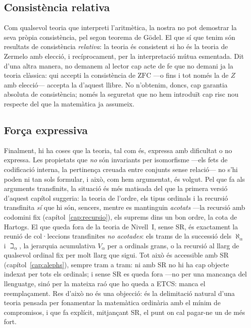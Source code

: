 \subsection{Consistència relativa}\label{subsec:consistencia}

Com qualsevol teoria que interpreti l'aritmètica, la nostra no pot
demostrar la seva pròpia consistència, pel segon teorema de Gödel. El que
sí que tenim són resultats de consistència \emph{relativa}: la teoria és
consistent si ho és la teoria de Zermelo amb elecció, i recíprocament, per
la interpretació mútua esmentada. Dit d'una altra manera, no demanem al
lector cap acte de fe que no demani ja la teoria clàssica: qui accepti la
consistència de \(\mathrm{ZFC}\) ---o fins i tot només la de \(Z\) amb
elecció--- accepta la d'aquest llibre. No n'obtenim, doncs, cap garantia
absoluta de consistència; només la seguretat que no hem introduït cap risc
nou respecte del que la matemàtica ja assumeix.

\subsection{Força expressiva}\label{subsec:expressiva}

Finalment, hi ha coses que la teoria, tal com és, expressa amb dificultat
o no expressa. Les propietats que \emph{no} són invariants per isomorfisme
---els fets de codificació interna, la pertinença creuada entre conjunts
sense relació--- no s'hi poden ni tan sols formular, i això, com hem
argumentat, és volgut. Pel que fa als arguments transfinits, la situació és
més matisada del que la primera versió d'aquest capítol suggeria: la teoria
de l'ordre, els tipus ordinals i la recursió transfinita \emph{sí} que hi
són, sencers, mentre es mantinguin \emph{acotats} ---la recursió amb codomini
fix (capítol~\ref{cap:recursio}), els suprems dins un bon ordre, la cota de
Hartogs. El que queda fora de la teoria de Nivell~I, sense SR, és
exactament la reunió de col·leccions transfinites \emph{no acotades}: els
trams de la successió dels \(\aleph_\alpha\) i \(\beth_\alpha\), la jerarquia
acumulativa \(V_\alpha\) per a ordinals grans, o la recursió al llarg de
qualsevol ordinal fix per molt llarg que sigui. Tot això és accessible amb SR
(capítol~\ref{cap:alephs}), sempre tram a tram: ni amb SR no hi ha cap
objecte indexat per tots els ordinals;
i sense SR es queda fora ---no per una mancança del llenguatge, sinó per la
mateixa raó que ho queda a ETCS: manca el reemplaçament. Res d'això no és
una objecció: és la delimitació natural d'una teoria pensada per fonamentar
la matemàtica ordinària amb el mínim de compromisos, i que fa explícit,
mitjançant SR, el punt on cal pagar-ne un de més fort.

